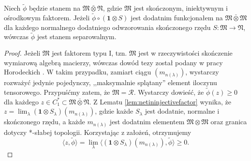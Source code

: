 \begin{Lemma}
\label{lem:step2}
Niech $\tilde{\phi}$ będzie stanem na
$\mathfrak{M} \bar{\otimes} \mathfrak{N}$,
gdzie $\mathfrak{M}$ jest skończonym, iniektywnym i ośrodkowym faktorem.
Jeżeli $\tilde{\phi} \circ ( \mathbf{1} \otimes S)$
jest dodatnim funkcjonałem na
$\mathfrak{M} \bar{\otimes} \mathfrak{M}$
dla każdego normalnego dodatniego odwzorowania skończonego rzędu
$S: \mathfrak{M} \rightarrow \mathfrak{N}$,
wówczas $\tilde{\phi}$ jest stanem separowalnym.
\end{Lemma}
\begin{proof}
Jeżeli $\mathfrak{M}$ jest faktorem typu I, tzn. $\mathfrak{M}$ jest
w rzeczywistości skończenie wymiarową algebrą macierzy,
wówczas dowód tezy został podany w pracy Horodeckich
\cite{horodecki1996separability}.
W takim przypadku, zamiart ciągu $(m_{n(\lambda)})$,
wystarczy rozważyć jedynie pojedynczy,
,,maksymalnie splątany'' element iloczynu tensorowego.
Przypuśćmy zatem, że $\mathfrak{M} = \mathcal{R}$.
Wystarczy dowieść, że
$\tilde{\phi}(z) \geq 0$ dla każdego
$z \in C_{1}^{*} \subset \mathfrak{M} \bar{\otimes} \mathfrak{N}$.
Z Lematu \ref{lem:netininjectivefactor} wynika, że
$z = \lim_{\lambda} (\mathbf{1} \otimes S_{\lambda})(m_{n(\lambda)})$,
gdzie każde $S_{\lambda}$
jest dodatnie, normalne i skończonego rzędu,
a każde $m_{n(\lambda)}$ jest dodatnim elementem $\mathfrak{M} \otimes \mathfrak{M}$
oraz granica dotyczy *-słabej topologii.
Korzystając z założeń, otrzymujemy
\begin{equation}
\langle z , \tilde{\phi} \rangle =\lim \limits_{\lambda}
\langle ( \mathbf{1} \otimes S_{\lambda}) (m_{n(\lambda)}), \tilde{\phi}
\rangle \geq 0.
\end{equation}
\end{proof}

